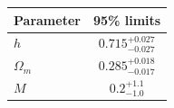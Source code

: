 \begin{tabular} { l  c}

 Parameter &  95\% limits\\
\hline
{\boldmath$h              $} & $0.715^{+0.027}_{-0.027}   $\\

{\boldmath$Ω_m            $} & $0.285^{+0.018}_{-0.017}   $\\

{\boldmath$M              $} & $0.2^{+1.1}_{-1.0}         $\\
\hline
\end{tabular}